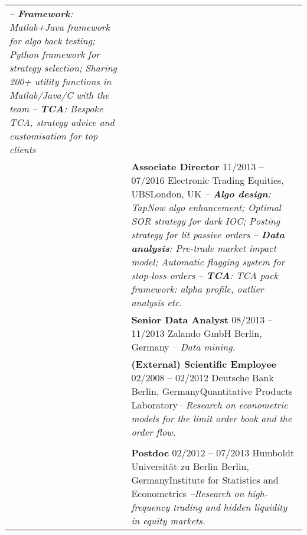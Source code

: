 \documentclass[a4paper,10pt]{article}
\begin{document}
\begin{longtable}[h]{p{}p{}}
    \emph{-- \textbf{Framework}: Matlab+Java framework for algo back testing; Python framework for strategy selection; Sharing 200+ utility functions in Matlab/Java/C with the team}\newline 
  \emph{-- \textbf{TCA}: Bespoke TCA, strategy advice and customisation for top clients}\\ 
  & \textbf{Associate Director} \hfill 11/2013 -- 07/2016 \newline Electronic Trading Equities, UBS\hfill London, UK\newline  
    \emph{-- \textbf{Algo design}: TapNow algo enhancement; Optimal SOR strategy for dark IOC; Posting strategy for lit passive orders} \newline
    \emph{-- \textbf{Data analysis}: Pre-trade market impact model; Automatic flagging system for stop-loss orders}\newline
    \emph{-- \textbf{TCA}: TCA pack framework: alpha profile, outlier analysis etc.}\\
  & \textbf{Senior Data Analyst} \hfill 08/2013 -- 11/2013 \newline Zalando GmbH \hfill Berlin, Germany \newline  \emph{-- Data mining.} \\
  & \textbf{(External) Scientific Employee} \hfill 02/2008 -- 02/2012 \newline Deutsche Bank \hfill Berlin, Germany\newline Quantitative Products Laboratory\newline \emph{-- Research on econometric models for the limit order book and the order flow.} \\
  \\
  & \textbf{Postdoc} \hfill 02/2012 -- 07/2013 \newline Humboldt Universit\"at zu Berlin \hfill Berlin, Germany\newline Institute for Statistics and Econometrics \newline \emph{--Research on high-frequency trading and hidden liquidity in equity markets.} \\


\end{longtable}
\end{document}
